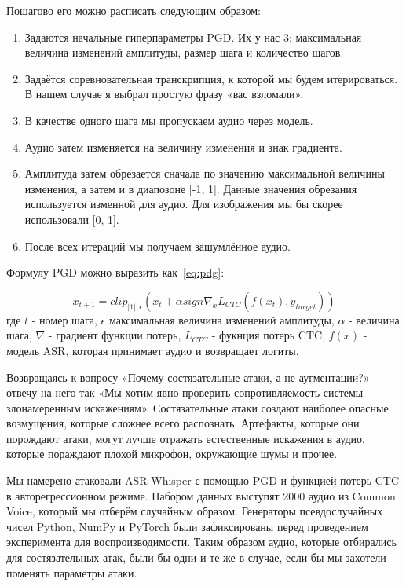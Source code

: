 Пошагово его можно расписать следующим образом:
\begin{enumerate}
  \item Задаются начальные гиперпараметры PGD.
  Их у нас 3: максимальная величина изменений амплитуды, размер шага и количество шагов.
  \item Задаётся соревновательная транскрипция, к которой мы будем итерироваться.
  В нашем случае я выбрал простую фразу «вас взломали».
  \item В качестве одного шага мы пропускаем аудио через модель.
  \item Аудио затем изменяется на величину изменения и знак градиента.
  \item Амплитуда затем обрезается сначала по значению максимальной величины изменения, а затем и в диапозоне [-1, 1].
  Данные значения обрезания используется изменной для аудио.
  Для изображения мы бы скорее использовали [0, 1].
  \item После всех итераций мы получаем зашумлённое аудио.
\end{enumerate}

Формулу PGD можно выразить как~\ref{eq:pdg}:

\begin{equation}
  x_{t+1} = clip_{|1|, \epsilon}(x_t + \alpha sign \nabla_x L_{CTC}(f(x_t), y_{target}))
  \label{eq:pdg}
\end{equation}
где $t$ - номер шага, $\epsilon$ максимальная величина изменений амплитуды, $\alpha$ - величина шага, $\nabla$ - градиент функции потерь, $L_{CTC}$ - фукнция потерь CTC, $f(x)$ - модель ASR, которая принимает аудио и возвращает логиты.

Возвращаясь к вопросу «Почему состязательные атаки, а не аугментации?» отвечу на него так «Мы хотим явно проверить сопротивляемость системы злонамеренным искажениям».
Состязательные атаки создают наиболее опасные возмущения, которые сложнее всего распознать.
Артефакты, которые они порождают атаки, могут лучше отражать естественные искажения в аудио, которые пораждают плохой микрофон, окружающие шумы и прочее\cite{engstrom2019adversarial}.

Мы намерено атаковали ASR Whisper с помощью PGD и функцией потерь CTC в авторегрессионном режиме.
Набором данных выступят 2000 аудио из Common Voice, который мы отберём случайным образом.
Генераторы псевдослучайных чисел Python, NumPy и PyTorch были зафиксированы перед проведением эксперимента для воспроизводимости.
Таким образом аудио, которые отбирались для состязательных атак, были бы одни и те же в случае, если бы мы захотели поменять параметры атаки.

